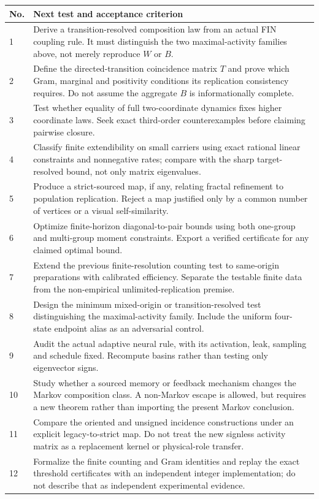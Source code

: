 \documentclass[11pt,a4paper]{article}
\begin{document}
\begin{longtable}{@{}p{}p{}@{}}
\toprule No. & Next test and acceptance criterion\\\midrule\endhead
1 & Derive a transition-resolved composition law from an actual FIN
coupling rule. It must distinguish the two maximal-activity families above,
not merely reproduce $W$ or $B$.\\[2mm]
2 & Define the directed-transition coincidence matrix $T$ and prove which
Gram, marginal and positivity conditions its replication consistency
requires. Do not assume the aggregate $B$ is informationally complete.\\[2mm]
3 & Test whether equality of full two-coordinate dynamics fixes higher
coordinate laws. Seek exact third-order counterexamples before claiming
pairwise closure.\\[2mm]
4 & Classify finite extendibility on small carriers using exact rational
linear constraints and nonnegative rates; compare with the sharp
target-resolved bound, not only matrix eigenvalues.\\[2mm]
5 & Produce a strict-sourced map, if any, relating fractal refinement to
population replication. Reject a map justified only by a common number
of vertices or a visual self-similarity.\\[2mm]
6 & Optimize finite-horizon diagonal-to-pair bounds using both one-group
and multi-group moment constraints. Export a verified certificate for any
claimed optimal bound.\\[2mm]
7 & Extend the previous finite-resolution counting test to same-origin
preparations with calibrated efficiency. Separate the testable finite data
from the non-empirical unlimited-replication premise.\\[2mm]
8 & Design the minimum mixed-origin or transition-resolved test distinguishing
the maximal-activity family. Include the uniform four-state endpoint alias
as an adversarial control.\\[2mm]
9 & Audit the actual adaptive neural rule, with its activation, leak,
sampling and schedule fixed. Recompute basins rather than testing only
eigenvector signs.\\[2mm]
10 & Study whether a sourced memory or feedback mechanism changes the
Markov composition class. A non-Markov escape is allowed, but requires a
new theorem rather than importing the present Markov conclusion.\\[2mm]
11 & Compare the oriented and unsigned incidence constructions under an
explicit legacy-to-strict map. Do not treat the new signless activity
matrix as a replacement kernel or physical-role transfer.\\[2mm]
12 & Formalize the finite counting and Gram identities and replay the
exact threshold certificates with an independent integer implementation;
do not describe that as independent experimental evidence.\\
\bottomrule
\end{longtable}
\end{document}
